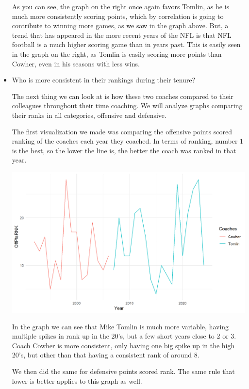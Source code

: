 \documentclass[
  letterpaper,
  DIV=11,
  numbers=noendperiod]{scrartcl}
\begin{document}
\begin{itemize}
  As you can see, the graph on the right once again favors Tomlin, as he
  is much more consistently scoring points, which by correlation is
  going to contribute to winning more games, as we saw in the graph
  above. But, a trend that has appeared in the more recent years of the
  NFL is that NFL football is a much higher scoring game than in years
  past. This is easily seen in the graph on the right, as Tomlin is
  easily scoring more points than Cowher, even in his seasons with less
  wins.
\item
  Who is more consistent in their rankings during their tenure?

  The next thing we can look at is how these two coaches compared to
  their colleagues throughout their time coaching. We will analyze
  graphs comparing their ranks in all categories, offensive and
  defensive.

  The first visualization we made was comparing the offensive points
  scored ranking of the coaches each year they coached. In terms of
  ranking, number 1 is the best, so the lower the line is, the better
  the coach was ranked in that year.

  \includegraphics{images/clipboard-2906734705.png}

  In the graph we can see that Mike Tomlin is much more variable, having
  multiple spikes in rank up in the 20's, but a few short years close to
  2 or 3. Coach Cowher is more consistent, only having one big spike up
  in the high 20's, but other than that having a consistent rank of
  around 8.

  We then did the same for defensive points scored rank. The same rule
  that lower is better applies to this graph as well.


\end{itemize}
\end{document}
